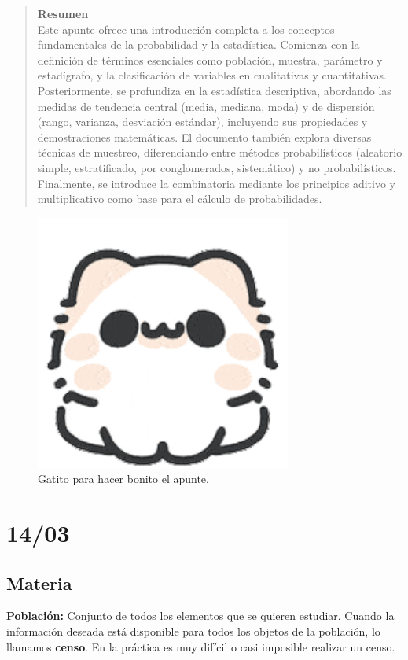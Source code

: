 \documentclass[12pt, letterpaper]{article}
\begin{document}
\begin{abstract}
    \noindent \textbf{Resumen} \\
    Este apunte ofrece una introducción completa a los conceptos fundamentales de la probabilidad y la estadística. Comienza con la definición de términos esenciales como población, muestra, parámetro y estadígrafo, y la clasificación de variables en cualitativas y cuantitativas. Posteriormente, se profundiza en la estadística descriptiva, abordando las medidas de tendencia central (media, mediana, moda) y de dispersión (rango, varianza, desviación estándar), incluyendo sus propiedades y demostraciones matemáticas. El documento también explora diversas técnicas de muestreo, diferenciando entre métodos probabilísticos (aleatorio simple, estratificado, por conglomerados, sistemático) y no probabilísticos. Finalmente, se introduce la combinatoria mediante los principios aditivo y multiplicativo como base para el cálculo de probabilidades.
\end{abstract}

\begin{figure}[htbp]
    \centering
    \includegraphics[width=0.75\textwidth]{gatito}
    \caption{Gatito para hacer bonito el apunte.}
    \label{fig:gatito}
\end{figure}
\newpage

\tableofcontents
\newpage %

\section{14/03}
\subsection{Materia}
\textbf{Población:} %
Conjunto de todos los elementos que se quieren estudiar. Cuando la información deseada está disponible para todos los objetos de la población, lo llamamos \textbf{censo}. En la práctica es muy difícil o casi imposible realizar un censo.
\end{document}

